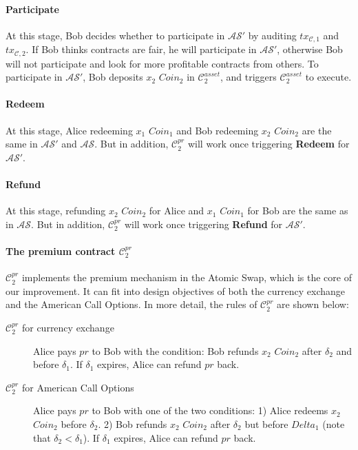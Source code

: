 \paragraph{\textbf{Participate}}
At this stage, Bob decides whether to participate in $\mathcal{AS}'$ by auditing $tx_{\mathcal{C}, 1}$ and $tx_{\mathcal{C}, 2}$.
If Bob thinks contracts are fair, he will participate in $\mathcal{AS}'$, otherwise Bob will not participate and look for more profitable contracts from others.
To participate in $\mathcal{AS}'$, Bob deposits $x_2$ $Coin_2$ in $\mathcal{C}^{asset}_2$, and triggers $\mathcal{C}^{asset}_2$ to execute.

\paragraph{\textbf{Redeem}}
At this stage, Alice redeeming $x_1$ $Coin_1$ and Bob redeeming $x_2$ $Coin_2$ are the same in $\mathcal{AS}'$ and $\mathcal{AS}$.
But in addition, $\mathcal{C}^{pr}_2$ will work once triggering \textbf{Redeem} for $\mathcal{AS}'$.

\paragraph{\textbf{Refund}}
At this stage, refunding $x_2$ $Coin_2$ for Alice and $x_1$ $Coin_1$ for Bob are the same as in $\mathcal{AS}$.
But in addition, $\mathcal{C}^{pr}_2$ will work once triggering \textbf{Refund} for $\mathcal{AS}'$.


\paragraph{The premium contract $\mathcal{C}^{pr}_2$}

$\mathcal{C}^{pr}_2$ implements the premium mechanism in the Atomic Swap, which is the core of our improvement.
It can fit into design objectives of both the currency exchange and the American Call Options.
In more detail, the rules of $\mathcal{C}^{pr}_2$ are shown below:

\begin{description}
    \item[$\mathcal{C}^{pr}_2$ for currency exchange] Alice pays $pr$ to Bob with the condition:
    Bob refunds $x_2$ $Coin_2$ after $\delta_2$ and before $\delta_1$.
    If $\delta_1$ expires, Alice can refund $pr$ back.
    \item[$\mathcal{C}^{pr}_2$ for American Call Options] Alice pays $pr$ to Bob with one of the two conditions:
    1) Alice redeems $x_2$ $Coin_2$ before $\delta_2$.
    2) Bob refunds $x_2$ $Coin_2$ after $\delta_2$ but before $Delta_1$ (note that $\delta_2 < \delta_1$).
    If $\delta_1$ expires, Alice can refund $pr$ back.
\end{description}